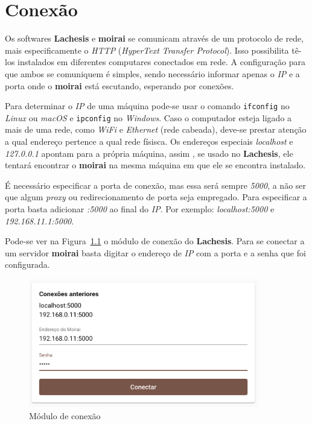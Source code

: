 
\chapter{Conexão}%
\label{chapter:connection}

Os softwares \textbf{Lachesis} e \textbf{moirai} se comunicam através de um
protocolo de rede, mais especificamente o \textit{HTTP} (\textit{HyperText
Transfer Protocol}). Isso possibilita tê-los instalados em diferentes computares
conectados em rede. A configuração para que ambos se comuniquem é simples, sendo
necessário informar apenas o \textit{IP} e a porta onde o \textbf{moirai} está
escutando, esperando por conexões.

Para determinar o \textit{IP} de uma máquina pode-se usar o comando
\texttt{ifconfig} no \textit{Linux} ou \textit{macOS} e
\texttt{ipconfig} no \textit{Windows}. Caso o computador esteja
ligado a mais de uma rede, como \textit{WiFi} e \textit{Ethernet} (rede
cabeada), deve-se prestar atenção a qual endereço pertence a qual rede físisca.
Os endereços especiais \textit{localhost} e \textit{127.0.0.1} apontam para a
própria máquina, assim , se usado no \textbf{Lachesis}, ele tentará encontrar o
\textbf{moirai} na mesma máquina em que ele se encontra instalado.

É necessário especificar a porta de conexão, mas essa será sempre \textit{5000},
a não ser que algum \textit{proxy} ou redirecionamento de porta seja empregado.
Para especificar a porta basta adicionar \textit{:5000} ao final do \textit{IP}.
Por exemplo: \textit{localhost:5000} e \textit{192.168.11.1:5000}.

Pode-se ver na Figura~\ref{fig:connect} o módulo de conexão do
\textbf{Lachesis}. Para se conectar a um servidor \textbf{moirai} basta digitar
o endereço de \textit{IP} com a porta e a senha que foi configurada.

\begin{figure}[ht!]
    \centering
    \includegraphics[width=0.9\textwidth]{imgs/connect}
    \caption[Módulo de conexão]{Módulo de conexão}%
    \label{fig:connect}
\end{figure}

